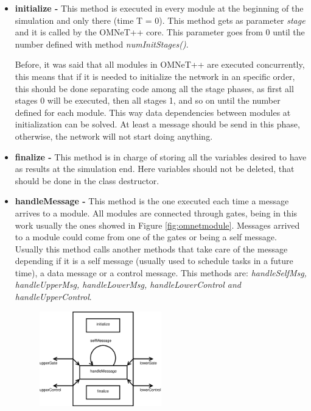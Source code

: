 \begin{itemize}
 \item \textbf{initialize - }This method is executed in every module at the beginning of the simulation and only there (time T = 0).
This method gets as parameter \textit{stage} and it is called by the \ac{OMNeT++} core. This parameter goes from 0 until the number defined with 
method \textit{numInitStages()}.

Before, it was said that all modules in \ac{OMNeT++} are executed concurrently, this means that if it is needed to initialize the network in 
an specific order, this should be done separating code among all the stage phases, as first all stages 0 will be executed, then all stages 1, 
and so on until the number defined for each module. This way data dependencies between modules at initialization can be solved. At least a 
message should be send in this phase, otherwise, the network will not start doing anything.
 \item \textbf{finalize - }This method is in charge of storing all the variables desired to have as results at the simulation end. Here variables
should not be deleted, that should be done in the class destructor.
 \item \textbf{handleMessage - }This method is the one executed each time a message arrives to a module. All modules are connected through gates,
being in this work usually the ones showed in Figure \ref{fig:omnetmodule}. Messages arrived to a module could come from one of the gates or being a self
message. Usually this method calls another methods that take care of the message depending if it is a self message (usually used to schedule 
tasks in a future time), a data message or a control message. This methods are: \textit{handleSelfMsg, handleUpperMsg, handleLowerMsg, 
handleLowerControl and handleUpperControl}.
\begin{figure}[ht]
 \begin{center}
  \includegraphics[width=0.5\textwidth]{omnetmodule.eps}
 \end{center}

\end{figure}
\end{itemize}

